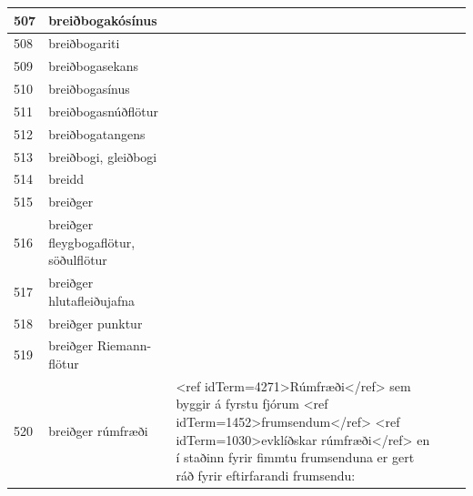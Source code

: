 \begin{longtable}{p{}|p{}|p{}|p{}|p{}}
\hline
507 & breiðbogakósínus &  &  &  \\
\hline
508 & breiðbogariti &  &  &  \\
\hline
509 & breiðbogasekans &  &  &  \\
\hline
510 & breiðbogasínus &  &  &  \\
\hline
511 & breiðbogasnúðflötur &  &  &  \\
\hline
512 & breiðbogatangens &  &  &  \\
\hline
513 & breiðbogi, gleiðbogi &  &  &  \\
\hline
514 & breidd &  &  &  \\
\hline
515 & breiðger &  &  &  \\
\hline
516 & breiðger fleygbogaflötur, söðulflötur &  &  &  \\
\hline
517 & breiðger hlutafleiðujafna &  &  &  \\
\hline
518 & breiðger punktur &  &  &  \\
\hline
519 & breiðger Riemann-flötur &  &  &  \\
\hline
520 & breiðger rúmfræði & <ref idTerm=4271>Rúmfræði</ref> sem byggir á fyrstu fjórum <ref idTerm=1452>frumsendum</ref> <ref idTerm=1030>evklíðskar rúmfræði</ref> en í staðinn fyrir fimmtu frumsenduna er gert ráð fyrir eftirfarandi frumsendu:


\end{longtable}
